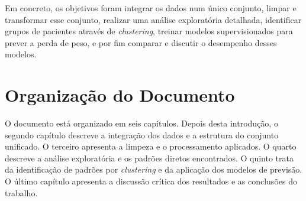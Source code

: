 Em concreto, os objetivos foram integrar os dados num único conjunto, limpar e transformar esse conjunto, realizar uma análise exploratória detalhada, identificar grupos de pacientes através de \textit{clustering}, treinar modelos supervisionados para prever a perda de peso, e por fim comparar e discutir o desempenho desses modelos.

\section{Organização do Documento}
O documento está organizado em seis capítulos. Depois desta introdução, o segundo capítulo descreve a integração dos dados e a estrutura do conjunto unificado. O terceiro apresenta a limpeza e o processamento aplicados. O quarto descreve a análise exploratória e os padrões diretos encontrados. O quinto trata da identificação de padrões por \textit{clustering} e da aplicação dos modelos de previsão. O último capítulo apresenta a discussão crítica dos resultados e as conclusões do trabalho.

